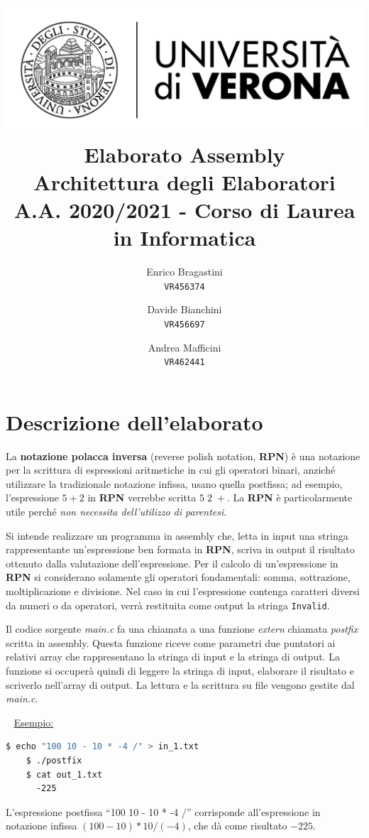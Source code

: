 \documentclass[a4paper,11pt,oneside]{book}
\title{
    {\includegraphics{logo-univr.png}} \\
    \LARGE{\textbf{Elaborato Assembly}} \\
    Architettura degli Elaboratori      \\
    A.A. 2020/2021 - Corso di Laurea in Informatica
}
\author{
  Enrico Bragastini\\
  \texttt{VR456374}
  \and
  Davide Bianchini \\
  \texttt{VR456697}
  \and
  Andrea Mafficini \\
  \texttt{VR462441}
}
\date{}
\begin{document}
\pagestyle{fancy}
\fancyhf{}
\rhead{}
\lhead{\nouppercase\leftmark}
\cfoot{\thepage}
\frontmatter

\maketitle
\tableofcontents

\mainmatter
\chapter{Descrizione dell'elaborato}
La \textbf{notazione polacca inversa} (reverse polish notation, \textbf{RPN}) è una notazione per la scrittura di espressioni aritmetiche in cui gli operatori binari, 
anziché utilizzare la tradizionale notazione infissa, usano quella postfissa; ad esempio, l’espressione $5 + 2$ in \textbf{RPN} verrebbe scritta $5 \; 2 \; +$. La \textbf{RPN} è 
particolarmente utile perché \emph{non necessita dell’utilizzo di parentesi}. 

Si intende realizzare un programma in assembly che, letta in input una stringa rappresentante un’espressione ben formata in \textbf{RPN}, scriva in output il risultato ottenuto dalla valutazione dell’espressione.
Per il calcolo di un'espressione in \textbf{RPN} si considerano solamente gli operatori fondamentali: somma, sottrazione, moltiplicazione e divisione.
Nel caso in cui l'espressione contenga caratteri diversi da numeri o da operatori, verrà restituita come output la stringa \verb|Invalid|.

Il codice sorgente \emph{main.c} fa una chiamata a una funzione \emph{extern} chiamata \emph{postfix} scritta in assembly. Questa funzione riceve come parametri due puntatori ai relativi array
che rappresentano la stringa di input e la stringa di output. La funzione si occuperà quindi di leggere la stringa di input, elaborare il risultato e scriverlo nell'array di output.
La lettura e la scrittura su file vengono gestite dal \emph{main.c}.

~\newline
\underline{Esempio:}
\begin{lstlisting}[language=Bash, showstringspaces=false]
    $ echo "100 10 - 10 * -4 /" > in_1.txt
    $ ./postfix
    $ cat out_1.txt 
      -225
\end{lstlisting}
L'espressione postfissa ``100 10 - 10 * -4 /'' corrisponde all'espressione in notazione infissa $(100-10) * 10 / (-4)$, che dà come risultato $-225$.
\end{document}
